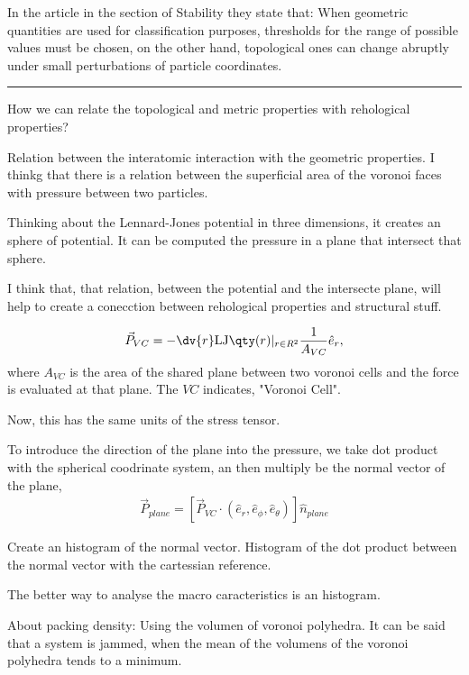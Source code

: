 \documentclass[a4paper, 11pt, oneside]{researchjournal} %
\begin{document}
In the article \cite{lazarVoronoiCellAnalysis2022} in the section of Stability they state that:
When geometric quantities are used for classification purposes, thresholds for the range of possible values must be chosen, on the other hand, topological ones can change abruptly under small perturbations of particle coordinates.



\rule{\textwidth}{0.4pt}


How we can relate the topological and metric properties with rehological properties?

Relation between the interatomic interaction with the geometric properties.
I thinkg that there is a relation between the superficial area of the voronoi faces with pressure between two particles.

Thinking about the Lennard-Jones potential in three dimensions, it creates an sphere of potential.
It can be computed the pressure in a plane that intersect that sphere.

I think that, that relation, between the potential and the intersecte plane, will help to create a conecction between rehological properties and structural stuff.

\begin{align*}
	\vec{P}_{VC} = -\dv{r}\mathrm{LJ}\qty(r)|_{r\in R^{2}}\frac{1}{A_{VC}}\hat{e}_{r},
\end{align*}
where $A_{VC}$ is the area of the shared plane between two voronoi cells and the force is evaluated at that plane.
The $VC$ indicates, "Voronoi Cell".

Now, this has the same units of the stress tensor.

To introduce the direction of the plane into the pressure, we take dot product with the spherical coodrinate system, an then multiply be the normal vector of the plane,
\begin{align*}
	\vec{P}_{plane} = \left[\vec{P}_{VC}\cdot\left(\hat{e}_r,\hat{e}_\phi,\hat{e}_\theta\right)\right]\hat{n}_{plane}
\end{align*}


Create an histogram of the normal vector.
Histogram of the dot product between the normal vector with the cartessian reference.

The better way to analyse the macro caracteristics is an histogram.


About packing density: Using the volumen of voronoi polyhedra.
It can be said that a system is jammed, when the mean of the volumens of the voronoi polyhedra tends to a minimum.


\printbibliography
\end{document}
